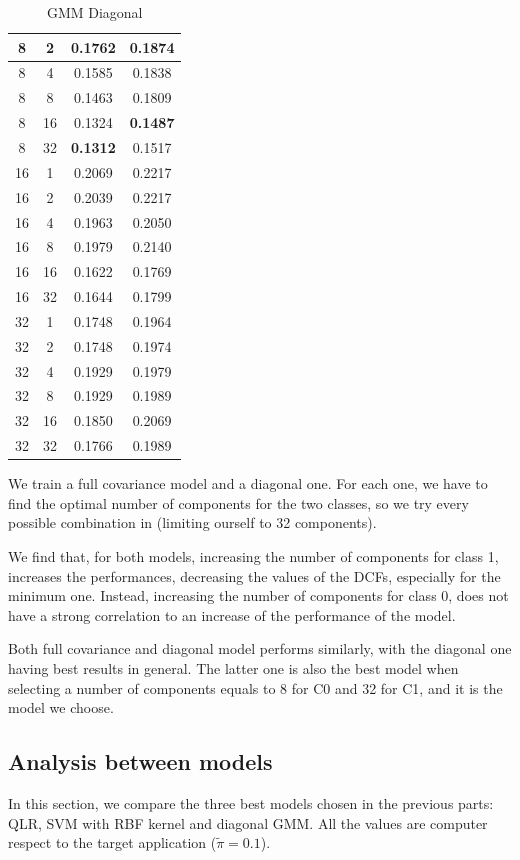 \documentclass[12pt, a4paper]{article}
\begin{document}
\begin{table}[ht!]
\begin{minipage}{.5\textwidth}
\begin{tabular}{|| c c c c ||}
\hline
8 & 2     & 0.1762 &  0.1874\\
\hline
8 & 4     & 0.1585 &  0.1838\\
\hline
8 & 8     & 0.1463 &  0.1809\\
\hline
8 & 16    & 0.1324 &  \textbf{0.1487}\\
\hline
8 & 32    & \textbf{0.1312} &  0.1517\\
\hline
16 & 1    & 0.2069 &  0.2217\\
\hline
16 & 2    & 0.2039 &  0.2217\\
\hline
16 & 4    & 0.1963 &  0.2050\\
\hline
16 & 8    & 0.1979 &  0.2140\\
\hline
16 & 16   & 0.1622 &  0.1769\\
\hline
16 & 32   & 0.1644 &  0.1799\\
\hline
32 & 1    & 0.1748 &  0.1964\\
\hline
32 & 2    & 0.1748 &  0.1974\\
\hline
32 & 4    & 0.1929 &  0.1979\\
\hline
32 & 8    & 0.1929 &  0.1989\\
\hline
32 & 16   & 0.1850 &  0.2069\\
\hline
32 & 32   & 0.1766 &  0.1989\\
\hline
 		\end{tabular}
		\caption{GMM Diagonal}
    \end{minipage}
\end{table}

We train a full covariance model and a diagonal one. For each one, we have to find the optimal number of components for the two classes, so we try every possible combination in (limiting ourself to 32 components).

We find that, for both models, increasing the number of components for class 1, increases the performances, decreasing the values of the DCFs, especially for the minimum one. Instead, increasing the number of components for class 0, does not have a strong correlation to an increase of the performance of the model.

Both full covariance and diagonal model performs similarly, with the diagonal one having best results in general. The latter one is also the best model when selecting a number of components equals to 8 for C0 and 32 for C1, and it is the model we choose.

\subsection{Analysis between models}
In this section, we compare the three best models chosen in the previous parts: QLR, SVM with RBF kernel and diagonal GMM. All the values are computer respect to the target application ($\tilde{\pi} = 0.1$).
\end{document}
